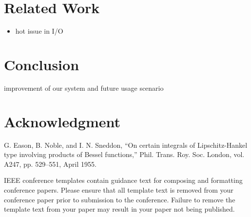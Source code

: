 \documentclass[conference]{IEEEtran}
\begin{document}
\section{Related Work}
\begin{itemize}
    \item hot issue in I/O
\end{itemize}

\section{Conclusion}
    improvement of our system and future usage scenario

\section*{Acknowledgment}




\begin{thebibliography}{00}
     G. Eason, B. Noble, and I. N. Sneddon, ``On certain integrals of Lipschitz-Hankel type involving products of Bessel functions,'' Phil. Trans. Roy. Soc. London, vol. A247, pp. 529--551, April 1955.
\end{thebibliography}
\vspace{12pt}
\color{red}
IEEE conference templates contain guidance text for composing and formatting conference papers. Please ensure that all template text is removed from your conference paper prior to submission to the conference. Failure to remove the template text from your paper may result in your paper not being published.
\end{document}
